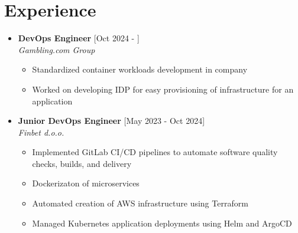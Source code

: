 \documentclass[a4paper]{moderncv}
\begin{document}
\makecvtitle



\section{Experience}

\begin{itemize}
	\item \textbf{DevOps Engineer} \hfill [Oct 2024 - ]\\
	\textit{Gambling.com Group}

	\begin{itemize}
		\vspace{-0.75em}
		\setlength\itemsep{0.1em}
		\item Standardized container workloads development in company
		\item Worked on developing IDP for easy provisioning of infrastructure for an application
	\end{itemize}

	\item \textbf{Junior DevOps Engineer} \hfill [May 2023 - Oct 2024]\\
	\textit{Finbet d.o.o.}

	\begin{itemize}
		\vspace{-0.75em}
		\setlength\itemsep{0.1em}
		\item Implemented GitLab CI/CD pipelines to automate software quality checks, builds, and delivery
		\item Dockerizaton of microservices
		\item Automated creation of AWS infrastructure using Terraform
		\item Managed Kubernetes application deployments using Helm and ArgoCD
	\end{itemize}

\end{itemize}	
\end{document}
